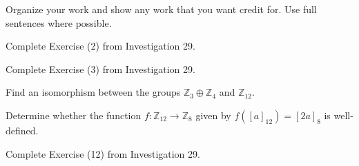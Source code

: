 \documentclass[addpoints]{exam}
\begin{document}
Organize your work and show any work that you want credit for. Use full sentences where possible.

\begin{questions}

\question 
Complete Exercise (2) from Investigation 29.

\question 
Complete Exercise (3) from Investigation 29.

\question Find an isomorphism between the groups $\mathbb{Z}_3\oplus\mathbb{Z}_4$ and $\mathbb{Z}_{12}$.

\question 
Determine whether the function $f\colon \mathbb{Z}_{12}\to\mathbb{Z}_8$ given by $f([a]_{12})=[2a]_8$ is well-defined.

\question 
Complete Exercise (12) from Investigation 29.



\end{questions}
\end{document}
